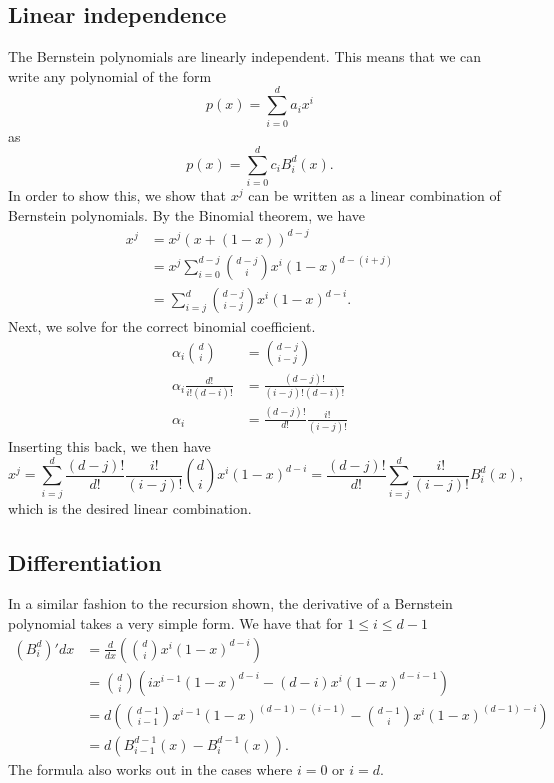 \subsection{Linear independence}
The Bernstein polynomials are linearly independent.
This means that we can write any polynomial of the form
\begin{equation}
    p(x) = \sum_{i = 0}^{d} a_i x^i
\end{equation}
as
\begin{equation}
    p(x) = \sum_{i = 0}^{d} c_i B_i^d(x).
\end{equation}
In order to show this, we show that $x^j$ can be written as a linear combination of Bernstein polynomials.
By the Binomial theorem, we have
\begin{align*}
    x^j &= x^j(x + (1 - x))^{d - j} \\
    &= x^j \sum_{i = 0}^{d - j} \binom{d - j}{i} x^i (1 - x)^{d - (i + j)} \\
    &= \sum_{i = j}^{d} \binom{d - j}{i - j} x^i (1 - x)^{d - i}.
\end{align*}
Next, we solve for the correct binomial coefficient.
\begin{align*}
    \alpha_i \binom{d}{i} &= \binom{d - j}{i - j} \\
    \alpha_i \frac{d!}{i! (d - i)!} &= \frac{(d - j)!}{(i - j)! (d - i)!}  \\
    \alpha_i &= \frac{(d - j)!}{d!} \frac{i!}{(i - j)!}
\end{align*}
Inserting this back, we then have
\begin{equation}
    x^j
    = \sum_{i = j}^{d} \frac{(d - j)!}{d!} \frac{i!}{(i - j)!} \binom{d}{i} x^i (1 - x)^{d - i}
    = \frac{(d - j)!}{d!} \sum_{i = j}^{d} \frac{i!}{(i - j)!} B_i^d(x),
\end{equation}
which is the desired linear combination.

\subsection{Differentiation}
In a similar fashion to the recursion shown, the derivative of a Bernstein polynomial takes a very simple form.
We have that for $1 \leq i \leq d - 1$
\begin{align*}
    (B_i^d)'{dx} &= \frac{d}{dx} \left( \binom{d}{i} x^i (1 - x)^{d - i} \right) \\
    &= \binom{d}{i} \left(
        i x^{i - 1} (1 - x)^{d - i}
        - (d - i) x^i (1 - x)^{d - i - 1}
    \right) \\
    &= d \left(
        \binom{d - 1}{i - 1} x^{i - 1} (1 - x)^{(d - 1) - (i - 1)}
        - \binom{d - 1}{i} x^i (1 - x)^{(d - 1) - i}
    \right) \\
    &= d \left( B_{i - 1}^{d - 1}(x) - B_i^{d - 1}(x) \right).
\end{align*}
The formula also works out in the cases where $i = 0$ or $i = d$.

